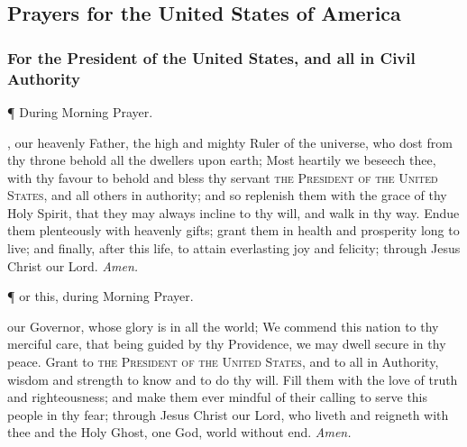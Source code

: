 \fancyhead[RO,LE]{}
\fancyhead[RE,LO]{}
\label{prayers}
{}

\subsection{Prayers for the United States of America}
\subsubsection{For the President of the United States, and all in Civil Authority}
\begin{inhead}
	\P{ }During Morning Prayer.
\end{inhead}
, our heavenly Father, the high and mighty Ruler of the universe, who dost from thy throne behold all the dwellers upon earth; Most heartily we beseech thee, with thy favour to behold and bless thy servant \textsc{the President of the United States}, and all others in authority; and so replenish them with the grace of thy Holy Spirit, that they may always incline to thy will, and walk in thy way. Endue them plenteously with heavenly gifts; grant them in health and prosperity long to live; and finally, after this life, to attain everlasting joy and felicity; through Jesus Christ our Lord. \textit{Amen.}


\vspace{0.25\baselineskip}

\begin{inhead}
	\P{ }or this, during Morning Prayer.
\end{inhead}

\vspace{0.25\baselineskip}

 our Governor, whose glory is in all the world; We commend this nation to thy merciful care, that being guided by thy Providence, we may dwell secure in thy peace. Grant to \textsc{the President of the United States}, and to all in Authority, wisdom and strength to know and to do thy will. Fill them with the love of truth and righteousness; and make them ever mindful of their calling to serve this people in thy fear; through Jesus Christ our Lord, who liveth and reigneth with thee and the Holy Ghost, one God, world without end. \textit{Amen.}


